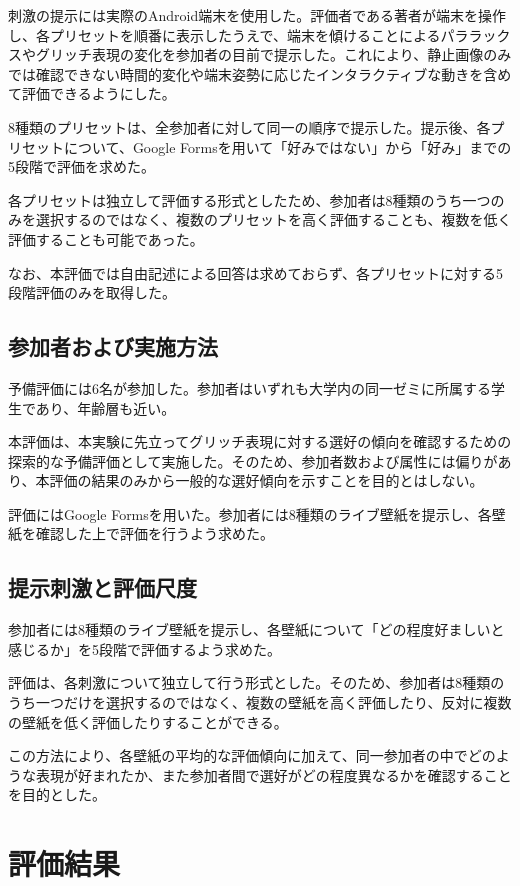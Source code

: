 刺激の提示には実際のAndroid端末を使用した。評価者である著者が端末を操作し、各プリセットを順番に表示したうえで、端末を傾けることによるパララックスやグリッチ表現の変化を参加者の目前で提示した。これにより、静止画像のみでは確認できない時間的変化や端末姿勢に応じたインタラクティブな動きを含めて評価できるようにした。

8種類のプリセットは、全参加者に対して同一の順序で提示した。提示後、各プリセットについて、Google Formsを用いて「好みではない」から「好み」までの5段階で評価を求めた。

各プリセットは独立して評価する形式としたため、参加者は8種類のうち一つのみを選択するのではなく、複数のプリセットを高く評価することも、複数を低く評価することも可能であった。

なお、本評価では自由記述による回答は求めておらず、各プリセットに対する5段階評価のみを取得した。

\subsection{参加者および実施方法}

予備評価には6名が参加した。参加者はいずれも大学内の同一ゼミに所属する学生であり、年齢層も近い。

本評価は、本実験に先立ってグリッチ表現に対する選好の傾向を確認するための探索的な予備評価として実施した。そのため、参加者数および属性には偏りがあり、本評価の結果のみから一般的な選好傾向を示すことを目的とはしない。

評価にはGoogle Formsを用いた。参加者には8種類のライブ壁紙を提示し、各壁紙を確認した上で評価を行うよう求めた。

\subsection{提示刺激と評価尺度}



参加者には8種類のライブ壁紙を提示し、各壁紙について「どの程度好ましいと感じるか」を5段階で評価するよう求めた。

評価は、各刺激について独立して行う形式とした。そのため、参加者は8種類のうち一つだけを選択するのではなく、複数の壁紙を高く評価したり、反対に複数の壁紙を低く評価したりすることができる。

この方法により、各壁紙の平均的な評価傾向に加えて、同一参加者の中でどのような表現が好まれたか、また参加者間で選好がどの程度異なるかを確認することを目的とした。

\section{評価結果}


